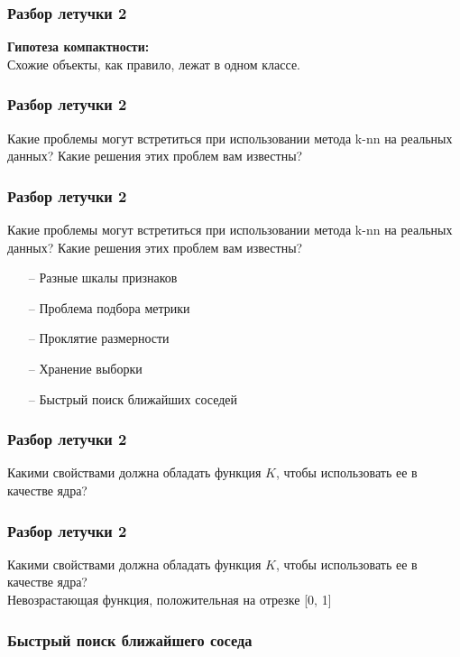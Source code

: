 \documentclass[12pt]{beamer}
\begin{document}
\begin{frame}\frametitle{Разбор летучки 2}
\textbf{Гипотеза компактности:}\\
Схожие объекты, как правило, лежат в одном классе.\\
\end{frame}

\begin{frame}\frametitle{Разбор летучки 2}
Какие проблемы могут встретиться при использовании метода k-nn на реальных
данных? Какие решения этих проблем вам известны?
\end{frame}

\begin{frame}\frametitle{Разбор летучки 2}
Какие проблемы могут встретиться при использовании метода k-nn на реальных
данных? Какие решения этих проблем вам известны?\\
\vspace{5mm}
\begin{itemize}
\item[--] Разные шкалы признаков
\item[--] Проблема подбора метрики
\item[--] Проклятие размерности
\item[--] Хранение выборки
\item[--] Быстрый поиск ближайших соседей
\end{itemize}
\end{frame}


\begin{frame}\frametitle{Разбор летучки 2}
Какими свойствами должна обладать функция $K$, чтобы использовать ее в качестве ядра?
\end{frame}

\begin{frame}\frametitle{Разбор летучки 2}
Какими свойствами должна обладать функция $K$, чтобы использовать ее в качестве ядра?\\
\vspace{5mm}
Невозрастающая функция, положительная на отрезке [0, 1]
\end{frame}


\begin{frame}\frametitle{Быстрый поиск ближайшего соседа}
\end{frame}
\end{document}
